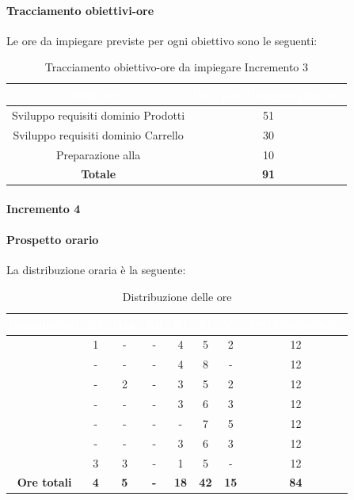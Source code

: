 \paragraph*{Tracciamento obiettivi-ore}
Le ore da impiegare previste per ogni obiettivo sono le seguenti:
\begin{table}[H]
	\begin{center}
		\begin{tabular}{ |c c| }
			\rowcolor{darkblue} 
			\textcolor{white}{\textbf{Obiettivo}}	& \textcolor{white}{\textbf{Ore per il raggiungimento}} \\ \hline
			{Sviluppo requisiti dominio Prodotti} 	& 51 	\\ \hline
			{Sviluppo requisiti dominio Carrello} 	& 30 	\\ \hline
			{Preparazione alla \glo{PB}} 			&  10	\\ \hline
			\textbf{Totale} 						& \textbf{91}  \\ \hline
		\end{tabular}
		\caption{Tracciamento obiettivo-ore da impiegare Incremento 3}
	\end{center}
\end{table}
\paragraph{Incremento 4}
\paragraph*{Prospetto orario}
La distribuzione oraria è la seguente:
\begin{table}[H]
	\begin{center}
		\begin{tabular}{ |c c c c c c c c| }
			\rowcolor{darkblue} 
			\textcolor{white}{\textbf{Nominativo}} & \textcolor{white}{\textbf{Re}} & \textcolor{white}{\textbf{Am}} & \textcolor{white}{\textbf{An}} & \textcolor{white}{\textbf{Pt}} & \textcolor{white}{\textbf{Pr}} & \textcolor{white}{\textbf{Ve}} & \textcolor{white}{\textbf{Ore Complessive}} \\ \hline
			\BL 	& 1  	& -  	& - 	& 4 	& 5 	& 2 	& 12 \\ \hline
			\FF 	& -  	& -  	& - 	& 4 	& 8 	& -  	& 12 \\ \hline
			\MM 	& -  	& 2  	& - 	& 3 	& 5 	& 2 	& 12 \\ \hline
			\PC 	& - 	& -  	& - 	& 3 	& 6 	& 3 	& 12 \\ \hline
			\TG 	& -  	& -		& - 	& - 	& 7 	& 5 	& 12 \\ \hline
			\TL 	& -  	& - 	& - 	& 3 	& 6 	& 3 	& 12 \\ \hline
			\VD 	& 3  	& 3  	& - 	& 1 	& 5 	& -		& 12 \\ \hline
			\textbf{Ore totali} & \textbf{4} & \textbf{5} & \textbf{-} & \textbf{18} & \textbf{42} & \textbf{15} & \textbf{84} \\ \hline
		\end{tabular}
		\caption{Distribuzione delle ore}
	\end{center}
\end{table}
